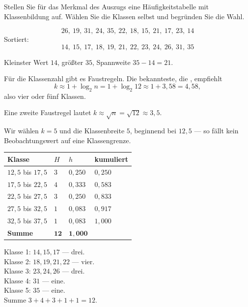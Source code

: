 \begin{aufgabe}
Stellen Sie für das Merkmal  des Auszugs eine Häufigkeitstabelle mit Klassenbildung auf. Wählen Sie die Klassen selbst und begründen Sie die Wahl.

\loesung
{}
\[ 26,\ 19,\ 31,\ 24,\ 35,\ 22,\ 18,\ 15,\ 21,\ 17,\ 23,\ 14 \]
Sortiert:
\[ 14,\ 15,\ 17,\ 18,\ 19,\ 21,\ 22,\ 23,\ 24,\ 26,\ 31,\ 35 \]

Kleinster Wert $14$, größter $35$, Spannweite $35 - 14 = 21$.

Für die Klassenzahl gibt es Faustregeln. Die bekannteste, die , empfiehlt
\[ k \approx 1 + \log_2 n = 1 + \log_2 12 \approx 1 + 3{,}58 = 4{,}58 , \]
also vier oder fünf Klassen.

Eine zweite Faustregel lautet $k \approx \sqrt{n} = \sqrt{12} \approx 3{,}5$.

Wir wählen $k = 5$ und die Klassenbreite $5$, beginnend bei $12{,}5$ --- so fällt kein Beobachtungswert auf eine Klassengrenze.

\begin{center}
{\small
\renewcommand{\arraystretch}{1.38}
\begin{tabular}{@{}P{2.4cm}P{1.2cm}P{1.6cm}P{2.2cm}@{}}
\toprule
\textbf{Klasse} & $H$ & $h$ & \textbf{kumuliert}\\
\midrule
$12{,}5$ bis $17{,}5$ & $3$ & $0{,}250$ & $0{,}250$\\
$17{,}5$ bis $22{,}5$ & $4$ & $0{,}333$ & $0{,}583$\\
$22{,}5$ bis $27{,}5$ & $3$ & $0{,}250$ & $0{,}833$\\
$27{,}5$ bis $32{,}5$ & $1$ & $0{,}083$ & $0{,}917$\\
$32{,}5$ bis $37{,}5$ & $1$ & $0{,}083$ & $1{,}000$\\
\midrule
\textbf{Summe} & $\mathbf{12}$ & $\mathbf{1{,}000}$ & \\
\bottomrule
\end{tabular}}
\end{center}

Klasse 1: $14, 15, 17$ --- drei. \checkmark\\
Klasse 2: $18, 19, 21, 22$ --- vier. \checkmark\\
Klasse 3: $23, 24, 26$ --- drei. \checkmark\\
Klasse 4: $31$ --- eine. \checkmark\\
Klasse 5: $35$ --- eine. \checkmark\\
Summe $3+4+3+1+1 = 12$. \checkmark


\end{aufgabe}
